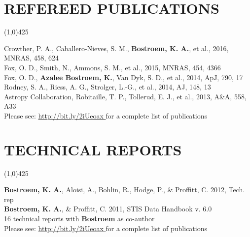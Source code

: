 \documentclass{res}
\begin{document}
\begin{resume}
\section{REFEREED PUBLICATIONS}
\vspace{-.2in} 
\begin{center}
\line(1,0){425}
\end{center}
\vspace{-.25in} 
\vspace{0.1in}
Crowther, P. A., Caballero-Nieves, S. M., {\bf Bostroem, K. A.}, et al., 2016, MNRAS, 458, 624\\
Fox, O. D., Smith, N., Ammons, S. M., et al., 2015, MNRAS, 454, 4366\\
Fox, O. D., {\bf Azalee Bostroem, K.}, Van Dyk, S. D., et al., 2014, ApJ, 790, 17\\
Rodney, S. A., Riess, A. G., Strolger, L.-G., et al., 2014, AJ, 148, 13\\
Astropy Collaboration, Robitaille, T. P., Tollerud, E. J., et al., 2013, A\&A, 558, A33 \\
Please see: \color{blue}\url{http://bit.ly/2iUeoax }\color{black}\hspace*{0pt} for a complete list of publications 
%
\section{TECHNICAL REPORTS}
\vspace{-.2in} 
\begin{center}
\line(1,0){425}
\end{center}
\vspace{-.25in} 
\vspace{0.1in}
{\bf Bostroem, K. A.}, Aloisi, A., Bohlin, R., Hodge, P., \& Proffitt, C. 2012, Tech. rep \\
{\bf Bostroem, K. A.}, \& Proffitt, C. 2011, STIS Data Handbook v. 6.0\\
16 technical reports with {\bf Bostroem} as co-author \\
Please see: \color{blue}\url{http://bit.ly/2iUeoax }\color{black}\hspace*{0pt} for a complete list of publications
%

\end{resume}
\end{document}
